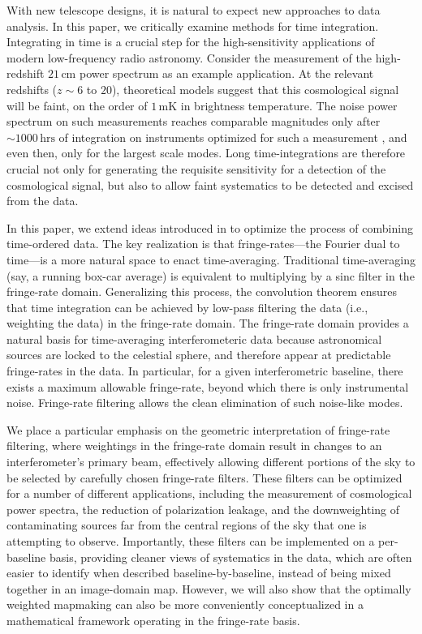 \documentclass[twocolumn,apj,numberedappendix]{emulateapj}
\begin{document}
With new telescope designs, it is natural to expect new approaches to data analysis. In this paper,
we critically examine methods for time integration. Integrating in time is a crucial step for the
high-sensitivity applications of modern low-frequency radio astronomy. Consider the measurement of
the high-redshift $21\,\textrm{cm}$ power spectrum as an example application. At the relevant redshifts ($z\sim 6$ to $20$), theoretical models suggest that this cosmological signal will be faint, on the order of $1\,\textrm{mK}$ in brightness temperature. The noise power spectrum on such
measurements reaches comparable magnitudes only after $\sim 1000\,\textrm{hrs}$ of integration
on instruments optimized for such a measurement \citep{parsons_et_al2012a}, and even then, only for the largest scale modes.
Long time-integrations are therefore crucial not only for generating the requisite sensitivity for a
detection of the cosmological signal, but also to allow faint systematics to be detected and excised
from the data.

In this paper, we extend ideas introduced in \citet{parsons_backer2009} to optimize the process of combining time-ordered data. The key realization is that fringe-rates---the Fourier dual to time---is a
more natural space to enact time-averaging. Traditional time-averaging (say, a running box-car average)
is equivalent to multiplying by a sinc filter in the fringe-rate domain. Generalizing this process, the
convolution theorem ensures that time integration can be achieved by low-pass filtering the data (i.e.,
weighting the data) in the fringe-rate domain. The fringe-rate domain provides a natural basis for time-averaging interferometeric
data because astronomical sources are locked to the celestial sphere, and therefore appear at
predictable fringe-rates in the data. In particular, for a given interferometric baseline, there exists
a maximum allowable fringe-rate, beyond which there is only instrumental noise. Fringe-rate filtering
allows the clean elimination of such noise-like modes.

We place a particular emphasis on the geometric interpretation of fringe-rate filtering,
where weightings in the fringe-rate domain result in changes to an interferometer's primary beam,
effectively allowing different portions of the sky to be selected by carefully chosen fringe-rate filters.
These filters can be optimized for a number of different applications, including the measurement
of cosmological power spectra, the reduction of polarization leakage, and the downweighting of
contaminating sources far from the central regions of the sky that one is attempting to observe.
Importantly, these filters can be implemented on a per-baseline basis, providing cleaner views
of systematics in the data, which are often easier to identify when described baseline-by-baseline,
instead of being mixed together in an image-domain map. However, we will also show that the
optimally weighted mapmaking can also be more conveniently conceptualized in a mathematical
framework operating in the fringe-rate basis.
\end{document}
